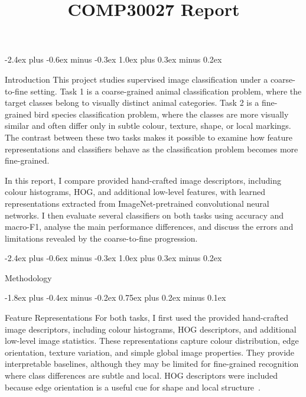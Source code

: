 \documentclass[11pt]{article}
\title{COMP30027 Report}
\makeatletter
\renewcommand\section{%
    \@startsection{section}{1}{\z@}%
                  {-2.4ex plus -0.6ex minus -0.3ex}%
                  {1.0ex plus 0.3ex minus 0.2ex}%
                  {\large\bf\raggedright}}
\renewcommand\subsection{%
    \@startsection{subsection}{2}{\z@}%
                  {-1.8ex plus -0.4ex minus -0.2ex}%
                  {0.75ex plus 0.2ex minus 0.1ex}%
                  {\normalsize\bf\raggedright}}
\makeatother
\begin{document}
\maketitle



\section{Introduction}
This project studies supervised image classification under a coarse-to-fine setting.
Task 1 is a coarse-grained animal classification problem, where the target classes
belong to visually distinct animal categories. Task 2 is a fine-grained bird species
classification problem, where the classes are more visually similar and often differ
only in subtle colour, texture, shape, or local markings. The contrast between these
two tasks makes it possible to examine how feature representations and classifiers
behave as the classification problem becomes more fine-grained.

In this report, I compare provided hand-crafted image descriptors, including colour
histograms, HOG, and additional low-level features, with learned representations
extracted from ImageNet-pretrained convolutional neural networks. I then evaluate
several classifiers on both tasks using accuracy and macro-F1, analyse the main
performance differences, and discuss the errors and limitations revealed by the
coarse-to-fine progression.



\section{Methodology}

\subsection{Feature Representations}
For both tasks, I first used the provided hand-crafted image descriptors,
including colour histograms, HOG descriptors, and additional 
low-level image statistics. These representations capture colour distribution, 
edge orientation, texture variation, and simple global image properties.
They provide interpretable baselines, although they may be limited for fine-grained
recognition where class differences are subtle and local. HOG descriptors were
included because edge orientation is a useful cue for shape and local
structure~\cite{dalal2005histograms}.
\end{document}
